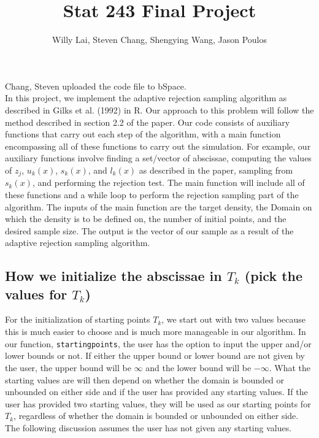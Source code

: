 \documentclass[12pt]{article}
\title{Stat 243 Final Project}
\author{Willy Lai, Steven Chang, Shengying Wang, Jason Poulos}
\begin{document}



\maketitle
Chang, Steven uploaded the code file to bSpace.\\
\newline
In this project, we implement the adaptive rejection sampling algorithm as described in Gilks et al. (1992) in \textsf{R}.  Our approach to this problem will follow the method described in section 2.2 of the paper.  Our code consists of auxiliary functions that carry out each step of the algorithm, with a main function encompassing all of these functions to carry out the simulation.  For example, our auxiliary functions involve finding a set/vector of abscissae, computing the values of $z_j$, $u_k(x)$, $s_k(x)$, and $l_k(x)$ as described in the paper, sampling from $s_k(x)$, and performing the rejection test.  The main function will include all of these functions and a while loop to perform the rejection sampling part of the algorithm.  The inputs of the main function are the target density, the Domain on which the density is to be defined on, the number of initial points, and the desired sample size.  The output is the vector of our sample as a result of the adaptive rejection sampling algorithm.

\subsection*{How we initialize the abscissae in $T_k$ (pick the values for $T_k$)}

For the initialization of starting points $T_k$, we start out with two values because this is much easier to choose and is much more manageable in our algorithm.  In our function, \texttt{startingpoints}, the user has the option to input the upper and/or lower bounds or not.  If either the upper bound or lower bound are not given by the user, the upper bound will be $\infty$ and the lower bound will be $-\infty$.  What the starting values are will then depend on whether the domain is bounded or unbounded on either side and if the user has provided any starting values.  If the user has provided two starting values, they will be used as our starting points for $T_k$, regardless of whether the domain is bounded or unbounded on either side.  The following discussion assumes the user has not given any starting values.\\
\end{document}
